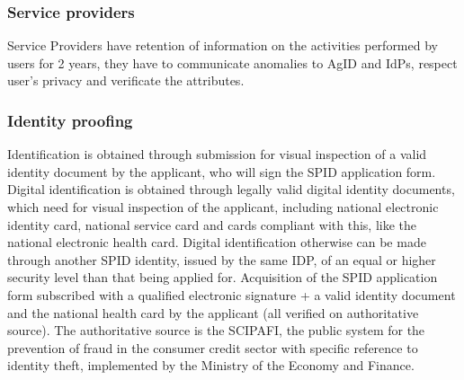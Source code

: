 \documentclass[a4paper, 10pt, titlepage]{article}
\begin{document}
\subsubsection{Service providers}
Service Providers have retention of information on the activities performed by users for 2 years, they have to communicate anomalies to AgID and IdPs, respect user's privacy and verificate the attributes.

\subsubsection{Identity proofing}
Identification is obtained through submission for visual inspection of a valid identity document by the applicant, who will sign the SPID application form. Digital identification is obtained through legally valid digital identity documents, which need for visual inspection of the applicant, including national electronic identity card, national service card and cards compliant with this, like the national electronic health card. Digital identification otherwise can be made through another SPID identity, issued by the same IDP, of an equal or higher security level than that being applied for.
Acquisition of the SPID application form subscribed with a qualified electronic signature + a valid identity document and the national health card by the applicant (all verified on authoritative source). The authoritative source is the SCIPAFI, the public system for the prevention of fraud in the consumer credit sector with specific reference to identity theft, implemented by the Ministry of the Economy and Finance.
\end{document}
